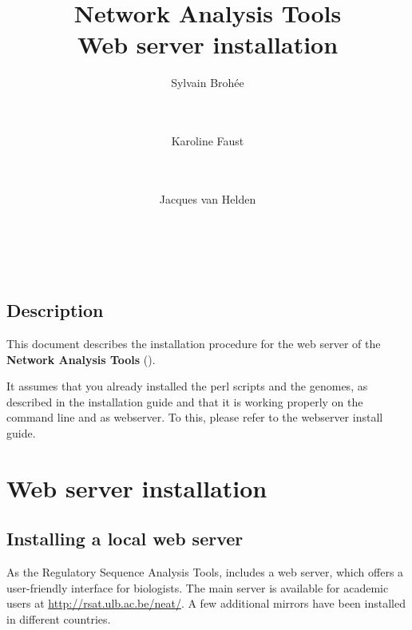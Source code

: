 \documentclass{book}
\begin{document}
\title{Network Analysis Tools \\
Web server installation}

\author{
	Sylvain Broh\'ee \\
	 \\
        \and \\
	Karoline Faust \\
	 \\
        \and \\
	Jacques van Helden \\
	\\
        \\
        \\
        \bigre
}


\maketitle

\newpage
\tableofcontents
\newpage

\section*{Description}

This document describes the installation procedure for the web server
of the \textbf{Network Analysis Tools} (\neat).

It assumes that you already installed the perl scripts and the
genomes, as described in the \RSAT installation guide and that it is
working properly on the command line and as webserver. To this, please refer to the \RSAT webserver install guide.

\chapter{Web server installation}
\section{Installing a local web server}

As the Regulatory Sequence Analysis Tools, \neat includes a web server, which
offers a user-friendly interface for biologists. The main server is
available for academic users at \url{http://rsat.ulb.ac.be/neat/}. A
few additional mirrors have been installed in different countries.
\end{document}
